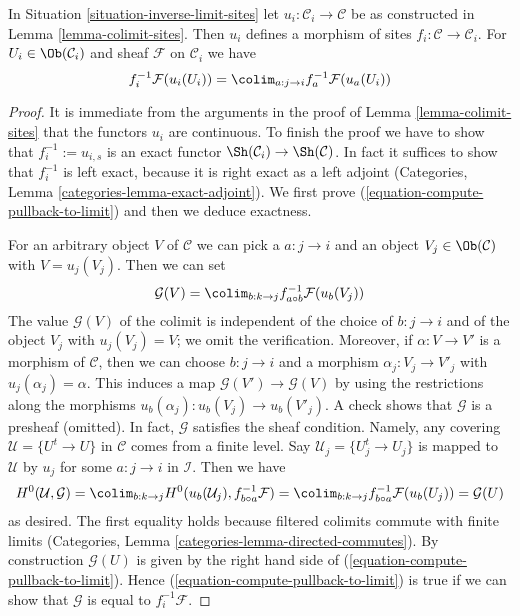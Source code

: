 \begin{lemma}
\label{lemma-compute-pullback-to-limit}
In Situation \ref{situation-inverse-limit-sites} let
$u_i : \mathcal{C}_i \to \mathcal{C}$ be as constructed in
Lemma \ref{lemma-colimit-sites}. Then $u_i$ defines a morphism
of sites $f_i : \mathcal{C} \to \mathcal{C}_i$. For
$U_i \in \Ob(\mathcal{C}_i)$ and sheaf $\mathcal{F}$ on $\mathcal{C}_i$ we have
\begin{equation}
\label{equation-compute-pullback-to-limit}
f_i^{-1}\mathcal{F}(u_i(U_i)) =
\colim_{a : j \to i} f_a^{-1}\mathcal{F}(u_a(U_i))
\end{equation}
\end{lemma}

\begin{proof}
It is immediate from the arguments in the proof of
Lemma \ref{lemma-colimit-sites} that the functors $u_i$ are continuous.
To finish the proof we have to show that $f_i^{-1} := u_{i, s}$
is an exact functor $\Sh(\mathcal{C}_i) \to \Sh(\mathcal{C})$.
In fact it suffices to show that $f_i^{-1}$ is left exact, because
it is right exact as a left adjoint
(Categories, Lemma \ref{categories-lemma-exact-adjoint}).
We first prove (\ref{equation-compute-pullback-to-limit})
and then we deduce exactness.

\medskip\noindent
For an arbitrary object $V$ of $\mathcal{C}$ we can pick a $a : j \to i$
and an object $V_j \in \Ob(\mathcal{C})$ with $V = u_j(V_j)$. Then we
can set
$$
\mathcal{G}(V) = \colim_{b : k \to j} f_{a \circ b}^{-1}\mathcal{F}(u_b(V_j))
$$
The value $\mathcal{G}(V)$ of the colimit is independent of the choice
of $b : j \to i$ and of the object $V_j$ with $u_j(V_j) = V$; we omit
the verification. Moreover, if $\alpha : V \to V'$ is a morphism of
$\mathcal{C}$, then we can choose $b : j \to i$ and a morphism
$\alpha_j : V_j \to V'_j$ with $u_j(\alpha_j) = \alpha$. This induces
a map $\mathcal{G}(V') \to \mathcal{G}(V)$ by using the restrictions
along the morphisms $u_b(\alpha_j) : u_b(V_j) \to u_b(V'_j)$. A check
shows that $\mathcal{G}$ is a presheaf (omitted).
In fact, $\mathcal{G}$ satisfies the sheaf condition. Namely,
any covering $\mathcal{U} = \{U^t \to U\}$ in $\mathcal{C}$
comes from a finite level. Say $\mathcal{U}_j = \{U^t_j \to U_j\}$
is mapped to $\mathcal{U}$ by $u_j$ for some $a : j \to i$ in $\mathcal{I}$.
Then we have
$$
H^0(\mathcal{U}, \mathcal{G}) =
\colim_{b : k \to j} H^0(u_b(\mathcal{U}_j), f_{b \circ a}^{-1}\mathcal{F}) =
\colim_{b : k \to j} f_{b \circ a}^{-1}\mathcal{F}(u_b(U_j)) =
\mathcal{G}(U)
$$
as desired. The first equality holds because filtered colimits commute
with finite limits
(Categories, Lemma \ref{categories-lemma-directed-commutes}).
By construction $\mathcal{G}(U)$ is given by the right hand side of
(\ref{equation-compute-pullback-to-limit}).
Hence (\ref{equation-compute-pullback-to-limit}) is true if we can
show that $\mathcal{G}$ is equal to $f_i^{-1}\mathcal{F}$.


\end{proof}
